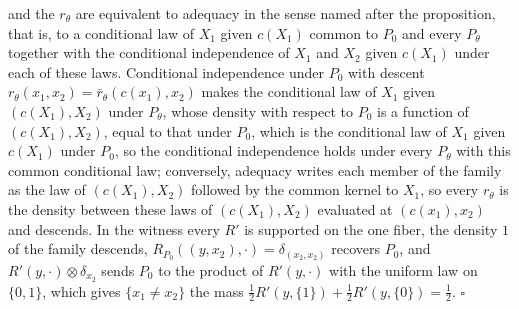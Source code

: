 and the $r_\theta$ are equivalent to adequacy in the sense named after the proposition, that is, to a
conditional law of $X_1$ given $c(X_1)$ common to $P_0$ and every $P_\theta$ together with the
conditional independence of $X_1$ and $X_2$ given $c(X_1)$ under each of these laws. Conditional
independence under $P_0$ with descent $r_\theta(x_1,x_2)=\bar r_\theta(c(x_1),x_2)$ makes the
conditional law of $X_1$ given $(c(X_1),X_2)$ under $P_\theta$, whose density with respect to $P_0$ is a
function of $(c(X_1),X_2)$, equal to that under $P_0$, which is the conditional law of $X_1$ given
$c(X_1)$ under $P_0$, so the conditional independence holds under every $P_\theta$ with this common
conditional law; conversely, adequacy writes each member of the family as the law of
$(c(X_1),X_2)$ followed by the common kernel to $X_1$, so every $r_\theta$ is the density between
these laws of $(c(X_1),X_2)$ evaluated at $(c(x_1),x_2)$ and descends. In the witness every $R'$ is
supported on the one fiber, the density $1$ of the family descends,
$R_{P_0}((y,x_2),\cdot)=\delta_{(x_2,x_2)}$ recovers $P_0$,
and $R'(y,\cdot)\otimes\delta_{x_2}$ sends $P_0$ to the product of $R'(y,\cdot)$ with the uniform law on
$\{0,1\}$, which gives $\{x_1\neq x_2\}$ the mass $\tfrac12R'(y,\{1\})+\tfrac12R'(y,\{0\})=\tfrac12$.
$\square$

